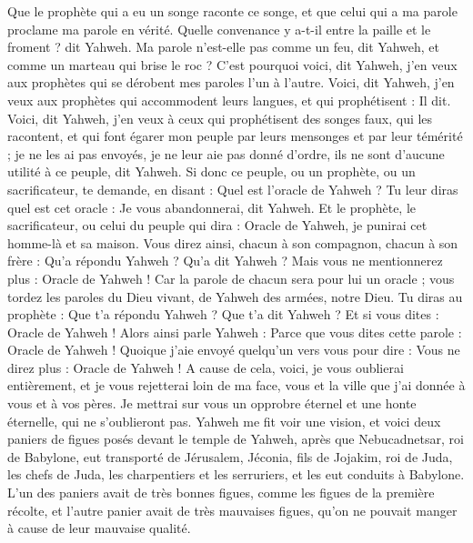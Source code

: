 \begin{multicols}{2}
Que le prophète qui a eu un songe raconte ce songe, et que celui qui a ma parole proclame ma parole en vérité. Quelle convenance y a-t-il entre la paille et le froment ? dit Yahweh.
Ma parole n'est-elle pas comme un feu, dit Yahweh, et comme un marteau qui brise le roc ?
C'est pourquoi voici, dit Yahweh, j'en veux aux prophètes qui se dérobent mes paroles l'un à l'autre.
Voici, dit Yahweh, j'en veux aux prophètes qui accommodent leurs langues, et qui prophétisent : Il dit.
Voici, dit Yahweh, j'en veux à ceux qui prophétisent des songes faux, qui les racontent, et qui font égarer mon peuple par leurs mensonges et par leur témérité ; je ne les ai pas envoyés, je ne leur aie pas donné d'ordre, ils ne sont d'aucune utilité à ce peuple, dit Yahweh.
Si donc ce peuple, ou un prophète, ou un sacrificateur, te demande, en disant : Quel est l'oracle de Yahweh ? Tu leur diras quel est cet oracle : Je vous abandonnerai, dit Yahweh.
Et le prophète, le sacrificateur, ou celui du peuple qui dira : Oracle de Yahweh, je punirai cet homme-là et sa maison.
Vous direz ainsi, chacun à son compagnon, chacun à son frère : Qu'a répondu Yahweh ? Qu'a dit Yahweh ?
Mais vous ne mentionnerez plus : Oracle de Yahweh ! Car la parole de chacun sera pour lui un oracle ; vous tordez les paroles du Dieu vivant, de Yahweh des armées, notre Dieu.
Tu diras au prophète : Que t'a répondu Yahweh ? Que t'a dit Yahweh ?
Et si vous dites : Oracle de Yahweh ! Alors ainsi parle Yahweh : Parce que vous dites cette parole : Oracle de Yahweh ! Quoique j'aie envoyé quelqu'un vers vous pour dire : Vous ne direz plus : Oracle de Yahweh !
A cause de cela, voici, je vous oublierai entièrement, et je vous rejetterai loin de ma face, vous et la ville que j'ai donnée à vous et à vos pères.
Je mettrai sur vous un opprobre éternel et une honte éternelle, qui ne s'oublieront pas.
\VerseOne{}Yahweh me fit voir une vision, et voici deux paniers de figues posés devant le temple de Yahweh, après que Nebucadnetsar, roi de Babylone, eut transporté de Jérusalem, Jéconia, fils de Jojakim, roi de Juda, les chefs de Juda, les charpentiers et les serruriers, et les eut conduits à Babylone.
L'un des paniers avait de très bonnes figues, comme les figues de la première récolte, et l'autre panier avait de très mauvaises figues, qu'on ne pouvait manger à cause de leur mauvaise qualité.

\end{multicols}
